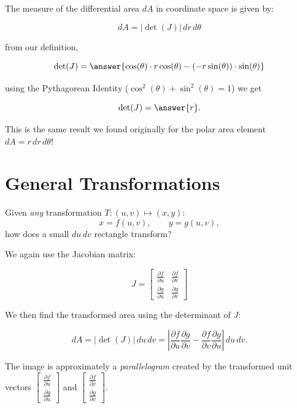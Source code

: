 \documentclass{ximera}
\begin{document}
\begin{problem}

The measure of the differential area $dA$ in coordinate space is given by:

$$dA=|\det(J)|\,dr\,d\theta$$

from our definition, 

$$\det(J) = \answer{\cos(\theta)\cdot r\cos(\theta) - (-r\sin(\theta))\cdot \sin(\theta)}$$

using the Pythagorean Identity ($\cos^2(\theta) + \sin^2(\theta) = 1$) we get

$$\det(J) = \answer{r}.$$

This is the same result we found originally for the polar area element $dA = r\,dr\,d\theta$!
\end{problem}

\section*{General Transformations}

Given \emph{any} transformation $T:(u,v)\mapsto(x,y)$:
\[
  x = f(u,v),\qquad y = g(u,v),
\]
how does a small $du\,dv$ rectangle transform?

We again use the Jacobian matrix:

$$J=\begin{bmatrix}
    \frac{\partial f}{\partial u} & \frac{\partial f}{\partial v} \\[6pt]
    \frac{\partial g}{\partial u} & \frac{\partial g}{\partial v}
  \end{bmatrix}$$

We then find the transformed area using the determinant of $J$:

$$dA = \left|\det(J)\right|\,du\,dv = \left|\frac{\partial f}{\partial u}\frac{\partial g}{\partial v} - \frac{\partial f}{\partial v}\frac{\partial g}{\partial u}\right|\,du\,dv.$$

The image is approximately a \emph{parallelogram} created by the transformed unit vectors $\begin{bmatrix}
    \frac{\partial f}{\partial u} \\[6pt]
    \frac{\partial g}{\partial u}
  \end{bmatrix}$ and $\begin{bmatrix}
    \frac{\partial f}{\partial v} \\[6pt]
    \frac{\partial g}{\partial v}
\end{bmatrix}$.
\end{document}
